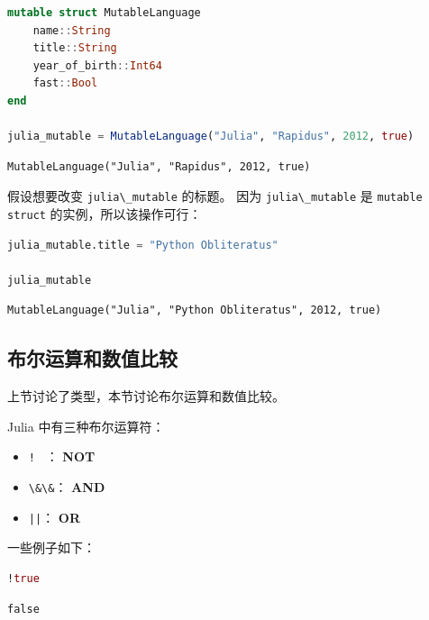 \documentclass[
  notoc %
]{tufte-book}
\providecommand{\tightlist}{%
  \setlength{\itemsep}{0pt}\setlength{\parskip}{0pt}
}
\newcommand{\passthrough}[1]{#1}
\begin{document}
\begin{lstlisting}[language=Julia]
mutable struct MutableLanguage
    name::String
    title::String
    year_of_birth::Int64
    fast::Bool
end

julia_mutable = MutableLanguage("Julia", "Rapidus", 2012, true)
\end{lstlisting}

\begin{lstlisting}[language=Output]
MutableLanguage("Julia", "Rapidus", 2012, true)
\end{lstlisting}

假设想要改变 \passthrough{\lstinline!julia\_mutable!} 的标题。 因为
\passthrough{\lstinline!julia\_mutable!} 是
\passthrough{\lstinline!mutable struct!} 的实例，所以该操作可行：

\begin{lstlisting}[language=Julia]
julia_mutable.title = "Python Obliteratus"

julia_mutable
\end{lstlisting}

\begin{lstlisting}[language=Output]
MutableLanguage("Julia", "Python Obliteratus", 2012, true)
\end{lstlisting}

\hypertarget{ux5e03ux5c14ux8fd0ux7b97ux548cux6570ux503cux6bd4ux8f83}{%
\subsection{布尔运算和数值比较}\label{ux5e03ux5c14ux8fd0ux7b97ux548cux6570ux503cux6bd4ux8f83}}

上节讨论了类型，本节讨论布尔运算和数值比较。

Julia 中有三种布尔运算符：

\begin{itemize}
\tightlist
\item
  \passthrough{\lstinline"!"} ~： \textbf{NOT}
\item
  \passthrough{\lstinline!\&\&!}： \textbf{AND}
\item
  \passthrough{\lstinline!||!}： \textbf{OR}
\end{itemize}

一些例子如下：

\begin{lstlisting}[language=Julia]
!true
\end{lstlisting}

\begin{lstlisting}[language=Output]
false
\end{lstlisting}
\end{document}
